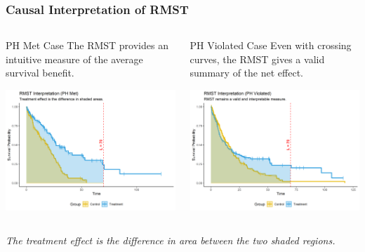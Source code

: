 \documentclass{beamer}
\begin{document}
\begin{frame}
\frametitle{Causal Interpretation of RMST}
\begin{columns}
\begin{column}{0.5\textwidth}
\begin{block}{PH Met Case}
The RMST provides an intuitive measure of the average survival benefit.
\end{block}
\includegraphics[width=\textwidth, height = 0.8\textwidth]{images/rmst_causal_plot_ph_met.png}
\end{column}
\begin{column}{0.5\textwidth}
\begin{block}{PH Violated Case}
Even with crossing curves, the RMST gives a valid summary of the net effect.
\end{block}
\includegraphics[width=\textwidth, height = 0.8\textwidth]{images/rmst_causal_plot_ph_violated.png}
\end{column}
\end{columns}

\textit{The treatment effect is the difference in area between the two shaded regions.}

\end{frame}
\end{document}
